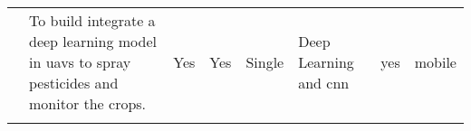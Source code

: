 {\begin{center}
\begin{small}
\begin{longtable}{ p{0.6cm} p{4cm} p{1.6cm} p{1.3cm} p{1.4cm} p{1.4cm} p{1.4cm} p{1.4cm} }
            \cite{Khan21}
                & To build integrate a deep 
                learning model in \glspl{uav} to spray 
                pesticides and monitor the crops.
                    & Yes 
                        & Yes 
            & Single 
                & Deep Learning and \gls{cnn} 
                    & yes 
                        & mobile \\ \addlinespace

            \bottomrule
        \end{longtable}
    \end{small}
\end{center}
}

